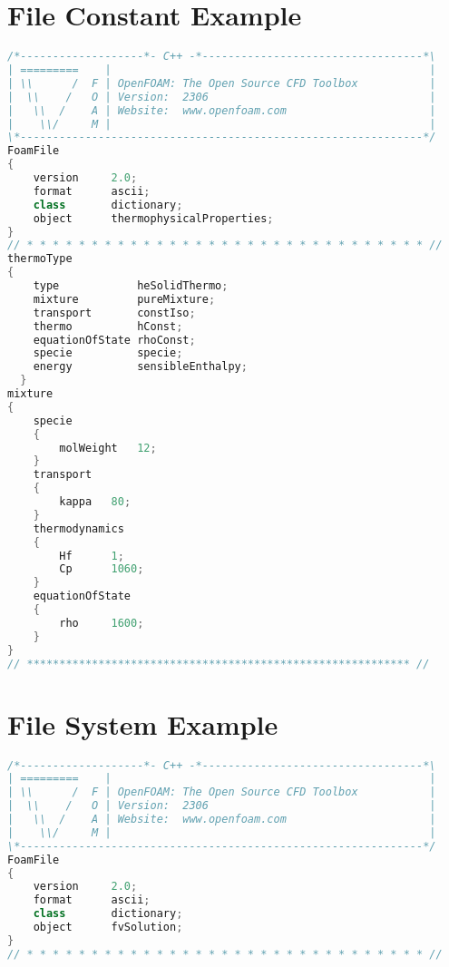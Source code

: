 \begin{theappendices}
\chapter{File Constant Example}
\begin{lstlisting}[language=c++, caption=OF dictiorary in constant/Brick/thermophysicalproperties]
/*-------------------*- C++ -*----------------------------------*\
| =========    |                                                 |
| \\      /  F | OpenFOAM: The Open Source CFD Toolbox           |
|  \\    /   O | Version:  2306                                  |
|   \\  /    A | Website:  www.openfoam.com                      |
|    \\/     M |                                                 |
\*--------------------------------------------------------------*/
FoamFile
{
    version     2.0;
    format      ascii;
    class       dictionary;
    object      thermophysicalProperties;
}
// * * * * * * * * * * * * * * * * * * * * * * * * * * * * * * * //
thermoType
{
    type            heSolidThermo;
    mixture         pureMixture;
    transport       constIso;
    thermo          hConst;
    equationOfState rhoConst;
    specie          specie;
    energy          sensibleEnthalpy;
  }
mixture
{
    specie
    {
        molWeight   12;
    }
    transport
    {
        kappa   80;
    }
    thermodynamics
    {
        Hf      1;
        Cp      1060;
    }
    equationOfState
    {
        rho     1600;
    }
}
// *********************************************************** //
\end{lstlisting}






\singlespacing
\chapter{File System Example}
\begin{lstlisting}[language=c++, caption=OF dictiorary in System/Brick/fvsolution]
/*-------------------*- C++ -*----------------------------------*\
| =========    |                                                 |
| \\      /  F | OpenFOAM: The Open Source CFD Toolbox           |
|  \\    /   O | Version:  2306                                  |
|   \\  /    A | Website:  www.openfoam.com                      |
|    \\/     M |                                                 |
\*--------------------------------------------------------------*/
FoamFile
{
    version     2.0;
    format      ascii;
    class       dictionary;
    object      fvSolution;
}
// * * * * * * * * * * * * * * * * * * * * * * * * * * * * * * * //


\end{lstlisting}
\end{theappendices}
